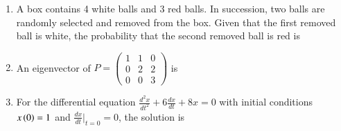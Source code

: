 \documentclass[12pt]{article}
\theoremstyle{remark}
\begin{document}
\begin{enumerate}
\item A box contains 4 white balls and 3 red balls. In succession, two balls are randomly selected and removed from the box. Given that the first removed ball is white, the probability that the second removed ball is red is
\begin{enumerate}
\end{enumerate}
\hfill{}

\item An eigenvector of $P=\begin{pmatrix} 1 & 1 & 0 \\ 0 & 2 & 2 \\ 0 & 0 & 3 \end{pmatrix}$ is
\begin{enumerate}
\end{enumerate}
\hfill{}

\item For the differential equation $\frac{d^2x}{dt^2} + 6\frac{dx}{dt} + 8x = 0$ with initial conditions $x\left(0\right)=1$ and $\frac{dx}{dt}|_{t=0}=0$, the solution is
\begin{enumerate}
\end{enumerate}
\hfill{}


\end{enumerate}
\end{document}
